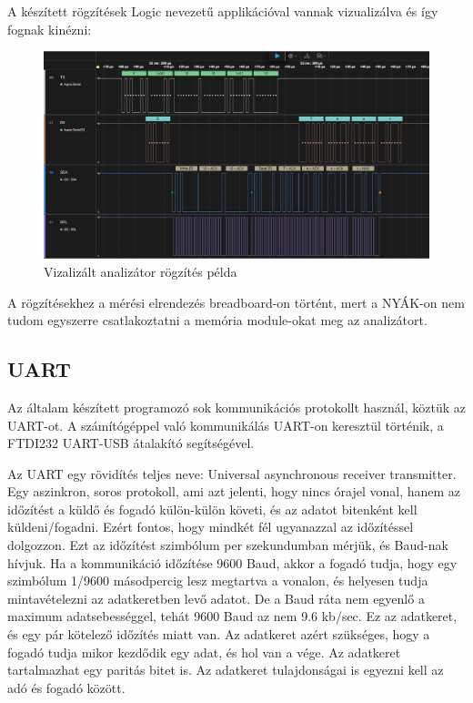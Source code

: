 \documentclass[a4paper,12pt,oneside]{book}
\begin{document}
A készített rögzítések Logic nevezetű applikációval vannak vizualizálva és így fognak kinézni:
\begin{figure}[H]
	\centering
	\includegraphics[trim=1mm 1mm 1mm 1mm,scale=0.3]{i2c small read.PNG}
	\caption{Vizalizált analizátor rögzítés példa}
	\label{Vizalizált analizátor rögzítés példa}
\end{figure}

A rögzítésekhez a mérési elrendezés breadboard-on történt, mert a NYÁK-on nem tudom egyszerre csatlakoztatni a memória module-okat meg az analizátort.

\subsection{UART}
Az általam készített programozó sok kommunikációs protokollt használ, köztük az UART-ot. A számítógéppel való kommunikálás UART-on keresztül történik, a FTDI232 UART-USB átalakító segítségével.

Az UART egy rövidítés teljes neve: Universal asynchronous receiver transmitter. Egy aszinkron, soros protokoll, ami azt jelenti, hogy nincs órajel vonal, hanem az időzítést a küldő és fogadó külön-külön követi, és az adatot bitenként kell küldeni/fogadni. Ezért fontos, hogy mindkét fél ugyanazzal az időzítéssel dolgozzon. Ezt az időzítést szimbólum per szekundumban mérjük, és Baud-nak hívjuk. Ha a kommunikáció időzítése 9600 Baud, akkor a fogadó tudja, hogy egy szimbólum 1/9600 másodpercig lesz megtartva a vonalon, és helyesen tudja mintavételezni az adatkeretben levő adatot. De a Baud ráta nem egyenlő a maximum adatsebességgel, tehát 9600 Baud az nem 9.6 kb/sec. Ez az adatkeret, és egy pár kötelező időzítés miatt van. Az adatkeret azért szükséges, hogy a fogadó tudja mikor kezdődik egy adat, és hol van a vége. Az adatkeret tartalmazhat egy paritás bitet is. Az adatkeret tulajdonságai is egyezni kell az adó és fogadó között.
\end{document}
